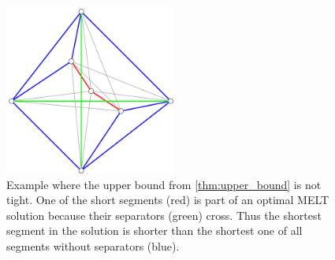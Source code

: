 

\begin{figure}[ht]
  \centering
  \includegraphics[width=0.5\textwidth]{img/upper_bound_tightness.pdf}
  \caption{
    \label{fig:upper_bound_tightness}
    Example where the upper bound from \cref{thm:upper_bound} is not 
    tight. One of the short segments (red) is part of an optimal 
    \gls{MELT} solution because their separators (green) cross. Thus
    the shortest segment in the solution is shorter than the shortest
    one of all segments without separators (blue).
  }
\end{figure}  


